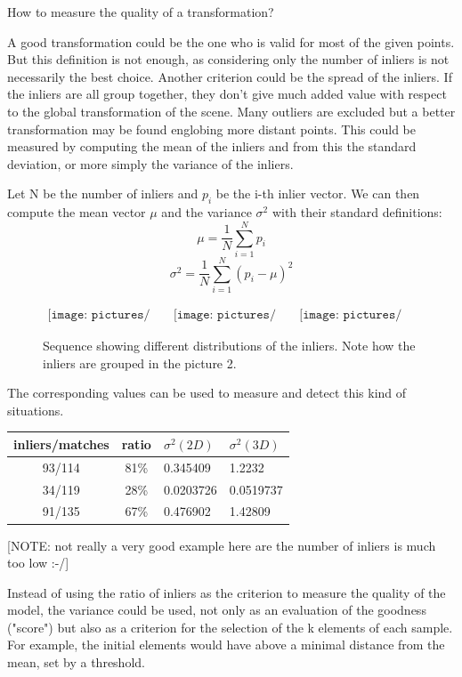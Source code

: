 \clearpage

How to measure the quality of a transformation?

A good transformation could be the one who is valid for most of the given points. But this definition is not enough, as considering only the number of inliers is not necessarily the best choice. Another criterion could be the spread of the inliers. If the inliers are all group together, they don't give much added value with respect to the global transformation of the scene. Many outliers are excluded but a better transformation may be found englobing more distant points. This could be measured by computing the mean of the inliers and from this the standard deviation, or more simply the variance of the inliers.

Let N be the number of inliers and $p_i$ be the i-th inlier vector. We can then compute the mean vector $\mu$ and the variance $\sigma^2$ with their standard definitions:
\[
\mu = \frac{1}{N} \sum_{i=1}^N{p_i}
\]
\[
\sigma^2 = \frac{1}{N} \sum_{i=1}^N{(p_i - \mu)^2}
\]

\begin{figure}[h!]
\centering$
\begin{array}{cccc}
\texttt{[image: pictures/bad\_transform1]} &
\texttt{[image: pictures/bad\_transform2]} &
\texttt{[image: pictures/bad\_transform3]}
\end{array}$
\caption{Sequence showing different distributions of the inliers. Note how the inliers are grouped in the picture 2.}
\end{figure}

The corresponding values can be used to measure and detect this kind of situations.

\begin{tabular}{ccll}
inliers/matches & ratio & $\sigma^2(2D)$ & $\sigma^2(3D)$\\
\hline
93/114 &	81\% &	0.345409 &	1.2232\\
34/119 &	28\% &	0.0203726 &	0.0519737\\
91/135 &	67\% &	0.476902 &	1.42809\\
\end{tabular}

[NOTE: not really a very good example here are the number of inliers is much too low :-/]

Instead of using the ratio of inliers as the criterion to measure the quality of the model, the variance could be used, not only as an evaluation of the goodness ("score") but also as a criterion for the selection of the k elements of each sample. For example, the initial elements would have above a minimal distance from the mean, set by a threshold.

